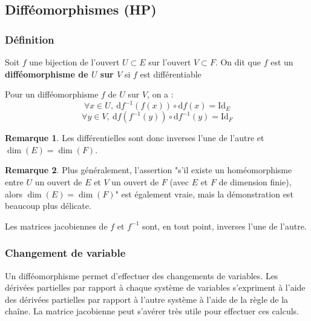 \documentclass[french]{article}
\newcommand{\inv}{^{-1}}
\renewcommand{\d}{\text{d}}
\theoremstyle{plain}
\theoremstyle{definition}
\newtheorem*{rmq}{Remarque}
\theoremstyle{remark}
\begin{document}
\subsection{Difféomorphismes (HP)}

\subsubsection*{Définition}

\begin{dfn}
	Soit $f$ une bijection de l'ouvert $U\subset E$ sur l'ouvert $V\subset F$. On dit que $f$ est un \textbf{difféomorphisme de $U$ sur $V$} si $f$ est différentiable
\end{dfn}

\begin{prop}%
	Pour un difféomorphisme $f$ de $U$ sur $V$, on a :
	$$\forall x\in U,\ \d f\inv(f(x))\circ\d f(x)=\text{Id}_E$$
	$$\forall y\in V,\ \d f(f\inv(y))\circ\d f\inv(y)=\text{Id}_F$$
\end{prop}

\begin{rmq}
	Les différentielles sont donc inverses l'une de l'autre et $\dim(E)=\dim(F)$.
\end{rmq}

\begin{rmq}
	Plus généralement, l'assertion "s'il existe un homéomorphisme entre $U$ un ouvert de $E$ et $V$ un ouvert de $F$ (avec $E$ et $F$ de dimension finie), alors $\dim(E)=\dim(F)$" est également vraie, mais la démonstration est beaucoup plus délicate.
\end{rmq}

\begin{cor}%
	Les matrices jacobiennes de $f$ et $f\inv$ sont, en tout point, inverses l'une de l'autre.
\end{cor}

\subsubsection*{Changement de variable}

Un difféomorphisme permet d'effectuer des changements de variables. Les dérivées partielles par rapport à chaque système de variables s'expriment à l'aide des dérivées partielles par rapport à l'autre système à l'aide de la règle de la chaîne. La matrice jacobienne peut s'avérer très utile pour effectuer ces calculs.
\end{document}
